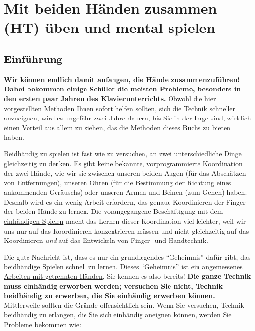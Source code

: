 
\section{Mit beiden Händen zusammen (HT) üben und mental spielen}
\label{c1ii25}


\subsection{Einführung}
\label{c1ii25a}

\textbf{Wir können endlich damit anfangen, die Hände zusammenzuführen!
Dabei bekommen einige Schüler die meisten Probleme, besonders in den ersten paar Jahren des Klavierunterrichts.}
Obwohl die hier vorgestellten Methoden Ihnen sofort helfen sollten, sich die Technik schneller anzueignen, wird es ungefähr zwei Jahre dauern, bis Sie in der Lage sind, wirklich einen Vorteil aus allem zu ziehen, das die Methoden dieses Buchs zu bieten haben.

Beidhändig zu spielen ist fast wie zu versuchen, an zwei unterschiedliche Dinge gleichzeitig zu denken.
Es gibt keine bekannte, vorprogrammierte Koordination der zwei Hände, wie wir sie zwischen unseren beiden Augen (für das Abschätzen von Entfernungen), unseren Ohren (für die Bestimmung der Richtung eines ankommenden Geräuschs) oder unseren Armen und Beinen (zum Gehen) haben.
Deshalb wird es ein wenig Arbeit erfordern, das genaue Koordinieren der Finger der beiden Hände zu lernen.
Die vorangegangene Beschäftigung mit dem \hyperref[c1ii7]{einhändigen Spielen} macht das Lernen dieser Koordination viel leichter, weil wir uns nur auf das Koordinieren konzentrieren müssen und nicht gleichzeitig auf das Koordinieren \textit{und} auf das Entwickeln von Finger- und Handtechnik.

Die gute Nachricht ist, dass es nur ein grundlegendes \enquote{Geheimnis} dafür gibt, das beidhändige Spielen schnell zu lernen.
Dieses \enquote{Geheimnis} ist ein angemessenes \hyperref[c1ii7]{Arbeiten mit getrennten Händen}, Sie kennen es also bereits!
\textbf{Die ganze Technik muss einhändig erworben werden;
versuchen Sie nicht, Technik beidhändig zu erwerben, die Sie einhändig erwerben können.}
Mittlerweile sollten die Gründe offensichtlich sein.
Wenn Sie versuchen, Technik beidhändig zu erlangen, die Sie sich einhändig aneignen können, werden Sie Probleme bekommen wie:

